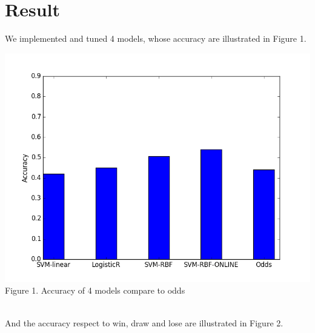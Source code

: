\documentclass[conference,11pt]{article}
\begin{document}
\section{Result}
We implemented and tuned 4 models, whose accuracy are illustrated in Figure 1.

\begin{center}
\includegraphics[scale = 0.5]{figure_1.png}\\
Figure 1. Accuracy of 4 models compare to odds
\end{center}
\ \\
And the accuracy respect to win, draw and lose are illustrated in Figure 2.
\end{document}
